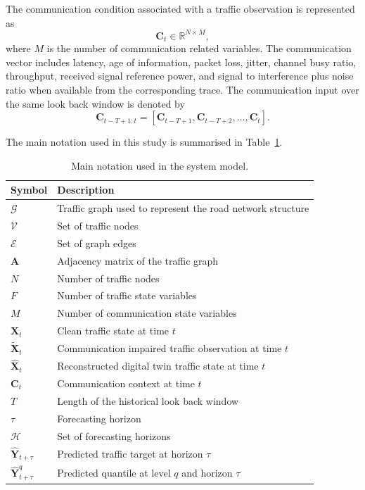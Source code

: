 \documentclass[pdflatex,sn-mathphys-num]{sn-jnl}%
\theoremstyle{thmstyleone}%
\theoremstyle{thmstyletwo}%
\theoremstyle{thmstylethree}%
\begin{document}
The communication condition associated with a traffic observation is represented as
\begin{equation}
    \mathbf{C}_{t} \in \mathbb{R}^{N\times M},
\end{equation}
where \(M\) is the number of communication related variables. The communication vector includes latency, age of information, packet loss, jitter, channel busy ratio, throughput, received signal reference power, and signal to interference plus noise ratio when available from the corresponding trace. The communication input over the same look back window is denoted by
\begin{equation}
    \mathbf{C}_{t-T+1:t} =
    \left[
    \mathbf{C}_{t-T+1},
    \mathbf{C}_{t-T+2},
    \ldots,
    \mathbf{C}_{t}
    \right].
\end{equation}

The main notation used in this study is summarised in Table~\ref{tab:notation_system_model}.

\begin{table}[t]
\centering
\caption{Main notation used in the system model.}
\label{tab:notation_system_model}
\small
\begin{tabular}{p{2.2cm} p{5.8cm}}
\hline
Symbol & Description \\
\hline
\(\mathcal{G}\) & Traffic graph used to represent the road network structure \\
\(\mathcal{V}\) & Set of traffic nodes \\
\(\mathcal{E}\) & Set of graph edges \\
\(\mathbf{A}\) & Adjacency matrix of the traffic graph \\
\(N\) & Number of traffic nodes \\
\(F\) & Number of traffic state variables \\
\(M\) & Number of communication state variables \\
\(\mathbf{X}_{t}\) & Clean traffic state at time \(t\) \\
\(\widetilde{\mathbf{X}}_{t}\) & Communication impaired traffic observation at time \(t\) \\
\(\widehat{\mathbf{X}}_{t}\) & Reconstructed digital twin traffic state at time \(t\) \\
\(\mathbf{C}_{t}\) & Communication context at time \(t\) \\
\(T\) & Length of the historical look back window \\
\(\tau\) & Forecasting horizon \\
\(\mathcal{H}\) & Set of forecasting horizons \\
\(\widehat{\mathbf{Y}}_{t+\tau}\) & Predicted traffic target at horizon \(\tau\) \\
\(\widehat{\mathbf{Y}}^{q}_{t+\tau}\) & Predicted quantile at level \(q\) and horizon \(\tau\) \\
\hline
\end{tabular}
\end{table}
\end{document}
